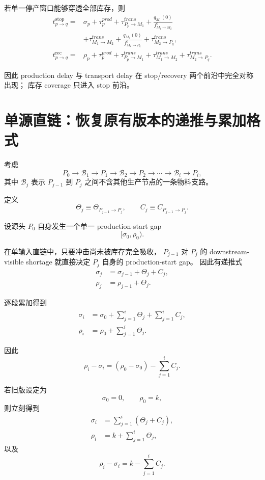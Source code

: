 \documentclass[UTF8,11pt]{ctexart}
\begin{document}
若单一停产窗口能够穿透全部库存，则
\[
\boxed{
\begin{aligned}
t_{p\to q}^{\mathrm{stop}}
={}&
\sigma_p
+\tau_p^{prod}
+\tau_{P_p\to M_1}^{trans}
+\frac{q_{M_1}(0)}{f_{M_1\to M_2}^{0}}
\\
&+
\tau_{M_1\to M_2}^{trans}
+\frac{q_{M_2}(0)}{f_{M_2\to P_q}^{0}}
+\tau_{M_2\to P_q}^{trans},
\\[2mm]
t_{p\to q}^{\mathrm{rec}}
={}&
\rho_p
+\tau_p^{prod}
+\tau_{P_p\to M_1}^{trans}
+\tau_{M_1\to M_2}^{trans}
+\tau_{M_2\to P_q}^{trans}.
\end{aligned}
}
\tag{12}
\]

因此 production delay 与 transport delay
在 stop/recovery 两个前沿中完全对称出现；
库存 coverage 只进入 stop 前沿。

\section{单源直链：恢复原有版本的递推与累加格式}

考虑
\[
P_0
\rightarrow\mathcal B_1
\rightarrow P_1
\rightarrow\mathcal B_2
\rightarrow P_2
\rightarrow\cdots
\rightarrow\mathcal B_i
\rightarrow P_i,
\]
其中 \(\mathcal B_j\) 表示
\(P_{j-1}\) 到 \(P_j\) 之间不含其他生产节点的一条物料支路。

定义
\[
\Theta_j
\equiv
\Theta_{P_{j-1}\to P_j},
\qquad
C_j
\equiv
C_{P_{j-1}\to P_j}.
\]

设源头 \(P_0\) 自身发生一个单一 production-start gap
\[
[\sigma_0,\rho_0).
\]

在单输入直链中，只要冲击尚未被库存完全吸收，
\(P_{j-1}\) 对 \(P_j\) 的 downstream-visible shortage
就直接决定 \(P_j\) 自身的 production-start gap。
因此有递推式
\[
\boxed{
\begin{aligned}
\sigma_j
&=
\sigma_{j-1}
+\Theta_j
+C_j,
\\[1mm]
\rho_j
&=
\rho_{j-1}
+\Theta_j.
\end{aligned}
}
\tag{13}
\]

逐段累加得到
\[
\boxed{
\begin{aligned}
\sigma_i
&=
\sigma_0
+\sum_{j=1}^{i}\Theta_j
+\sum_{j=1}^{i}C_j,
\\[1mm]
\rho_i
&=
\rho_0
+\sum_{j=1}^{i}\Theta_j.
\end{aligned}
}
\tag{14}
\]

因此
\[
\boxed{
\rho_i-\sigma_i
=
(\rho_0-\sigma_0)
-
\sum_{j=1}^{i}C_j.
}
\tag{15}
\]

若旧版设定为
\[
\sigma_0=0,
\qquad
\rho_0=k,
\]
则立刻得到
\[
\boxed{
\begin{aligned}
\sigma_i
&=
\sum_{j=1}^{i}(\Theta_j+C_j),
\\[1mm]
\rho_i
&=
k+\sum_{j=1}^{i}\Theta_j,
\end{aligned}
}
\tag{16}
\]
以及
\[
\boxed{
\rho_i-\sigma_i
=
k-\sum_{j=1}^{i}C_j.
}
\tag{17}
\]
\end{document}

